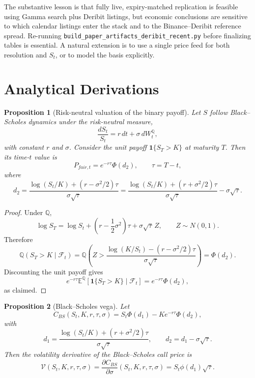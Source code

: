 \documentclass[11pt]{article}
\numberwithin{equation}{section}
\theoremstyle{plain}
\newtheorem{proposition}{Proposition}[section]
\begin{document}
The substantive lesson is that fully live, expiry-matched replication is feasible using Gamma search plus Deribit listings, but economic conclusions are sensitive to which calendar listings enter the stack and to the Binance--Deribit reference spread. Re-running \texttt{build\_paper\_artifacts\_deribit\_recent.py} before finalizing tables is essential. A natural extension is to use a single price feed for both resolution and $S_t$, or to model the basis explicitly.

\appendix

\section{Analytical Derivations}

\begin{proposition}[Risk-neutral valuation of the binary payoff]
\label{prop:digital-price}
Let $S$ follow Black--Scholes dynamics under the risk-neutral measure,
\[
\frac{dS_t}{S_t}=r\,dt+\sigma\,dW_t^{\mathbb{Q}},
\]
with constant $r$ and $\sigma$. Consider the unit payoff $\mathbf{1}\{S_T>K\}$ at maturity $T$. Then its time-$t$ value is
\[
P_{fair,t}=e^{-r\tau}\Phi(d_2),
\qquad
\tau=T-t,
\]
where
\[
d_2=\frac{\log(S_t/K)+(r-\sigma^2/2)\tau}{\sigma\sqrt{\tau}}
=
\frac{\log(S_t/K)+(r+\sigma^2/2)\tau}{\sigma\sqrt{\tau}}-\sigma\sqrt{\tau}.
\]
\end{proposition}

\begin{proof}
Under $\mathbb{Q}$,
\[
\log S_T
=
\log S_t+\left(r-\frac{1}{2}\sigma^2\right)\tau+\sigma\sqrt{\tau}\,Z,
\qquad
Z\sim N(0,1).
\]
Therefore
\[
\mathbb{Q}(S_T>K\mid\mathcal{F}_t)
=
\mathbb{Q}\!\left(
Z>
\frac{\log(K/S_t)-\left(r-\sigma^2/2\right)\tau}{\sigma\sqrt{\tau}}
\right)
=
\Phi(d_2).
\]
Discounting the unit payoff gives
\[
e^{-r\tau}\mathbb{E}^{\mathbb{Q}}\!\left[\mathbf{1}\{S_T>K\}\mid\mathcal{F}_t\right]
=
e^{-r\tau}\Phi(d_2),
\]
as claimed.
\end{proof}

\begin{proposition}[Black--Scholes vega]
\label{prop:vega-formula}
Let
\[
C_{BS}(S_t,K,r,\tau,\sigma)=S_t\Phi(d_1)-Ke^{-r\tau}\Phi(d_2),
\]
with
\[
d_1=\frac{\log(S_t/K)+(r+\sigma^2/2)\tau}{\sigma\sqrt{\tau}},
\qquad
d_2=d_1-\sigma\sqrt{\tau}.
\]
Then the volatility derivative of the Black--Scholes call price is
\[
\mathcal{V}(S_t,K,r,\tau,\sigma)
=
\frac{\partial C_{BS}}{\partial \sigma}(S_t,K,r,\tau,\sigma)
=
S_t\phi(d_1)\sqrt{\tau}.
\]
\end{proposition}
\end{document}
